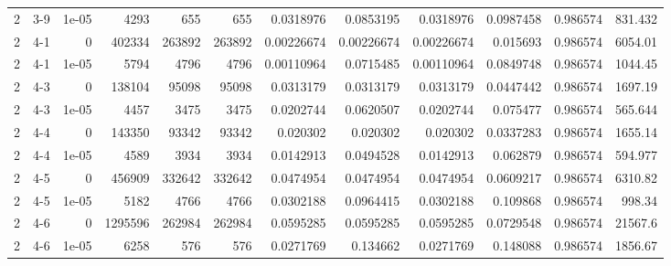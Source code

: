 \begin{tabular}{rlrrrrrrrrrr}
     2 & 3-9    &      1e-05 &        4293 &               655 &               655 &     0.0318976   &     0.0853195   &      0.0318976   &        0.0987458 &               0.986574 &          831.432   \\
     2 & 4-1    &      0     &      402334 &            263892 &            263892 &     0.00226674  &     0.00226674  &      0.00226674  &        0.015693  &               0.986574 &         6054.01    \\
     2 & 4-1    &      1e-05 &        5794 &              4796 &              4796 &     0.00110964  &     0.0715485   &      0.00110964  &        0.0849748 &               0.986574 &         1044.45    \\
     2 & 4-3    &      0     &      138104 &             95098 &             95098 &     0.0313179   &     0.0313179   &      0.0313179   &        0.0447442 &               0.986574 &         1697.19    \\
     2 & 4-3    &      1e-05 &        4457 &              3475 &              3475 &     0.0202744   &     0.0620507   &      0.0202744   &        0.075477  &               0.986574 &          565.644   \\
     2 & 4-4    &      0     &      143350 &             93342 &             93342 &     0.020302    &     0.020302    &      0.020302    &        0.0337283 &               0.986574 &         1655.14    \\
     2 & 4-4    &      1e-05 &        4589 &              3934 &              3934 &     0.0142913   &     0.0494528   &      0.0142913   &        0.062879  &               0.986574 &          594.977   \\
     2 & 4-5    &      0     &      456909 &            332642 &            332642 &     0.0474954   &     0.0474954   &      0.0474954   &        0.0609217 &               0.986574 &         6310.82    \\
     2 & 4-5    &      1e-05 &        5182 &              4766 &              4766 &     0.0302188   &     0.0964415   &      0.0302188   &        0.109868  &               0.986574 &          998.34    \\
     2 & 4-6    &      0     &     1295596 &            262984 &            262984 &     0.0595285   &     0.0595285   &      0.0595285   &        0.0729548 &               0.986574 &        21567.6     \\
     2 & 4-6    &      1e-05 &        6258 &               576 &               576 &     0.0271769   &     0.134662    &      0.0271769   &        0.148088  &               0.986574 &         1856.67    \\

\end{tabular}
